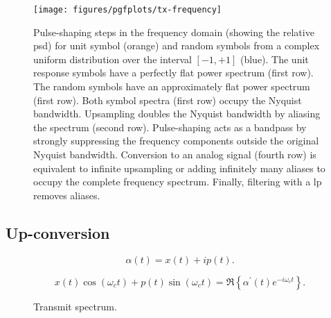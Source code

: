 \begin{figure}[htb]
	\centering
	\texttt{[image: figures/pgfplots/tx-frequency]}
	\caption{Pulse-shaping steps in the frequency domain (showing the relative \gls{psd}) for unit symbol (orange) and random symbols from a complex uniform distribution over the interval $[-1,+1]$ (blue). The unit response symbols have a perfectly flat power spectrum (first row). The random symbols have an approximately flat power spectrum (first row). Both symbol spectra (first row) occupy the Nyquist bandwidth. Upsampling doubles the Nyquist bandwidth by aliasing the spectrum (second row). Pulse-shaping acts as a bandpass by strongly suppressing the frequency components outside the original Nyquist bandwidth. Conversion to an analog signal (fourth row) is equivalent to infinite upsampling or adding infinitely many aliases to occupy the complete frequency spectrum. Finally, filtering with a \gls{lp} removes aliases.}\label{fig:pulse_shaping_freq}
\end{figure}

\subsection{Up-conversion}

\begin{equation}
	\alpha(t)
	=
	x(t)
	+
	ip(t)
	.
\end{equation}

\begin{equation}
	x(t)
	\cos(\omega_ct)
	+
	p(t)
	\sin(\omega_ct)
	=
	\Re\left\{
		\alpha^\prime(t)
		e^{-i\omega_ct}
	\right\}
	\label{eq:passband_signal}.
\end{equation}

\begin{figure}[htb]
	\centering
	\caption{Transmit spectrum.}\label{fig:transmit_spectrum}
\end{figure}